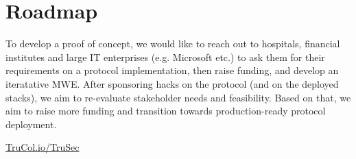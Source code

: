 \vspace{-0.16cm}
\section{Roadmap}
\vspace{-0.15cm}
To develop a proof of concept, we would like to reach out to hospitals, financial institutes and large IT enterprises (e.g. Microsoft etc.) to ask them for their requirements on a protocol implementation, then raise funding, and develop an iteratative MWE. After sponsoring hacks on the protocol (and on the deployed stacks), we aim to re-evaluate stakeholder needs and feasibility. Based on that, we aim to raise more funding and transition towards production-ready protocol deployment.

\vspace{2.2cm}
\href{https://www.TruCol.io/TruSec}{TruCol.io/TruSec}%